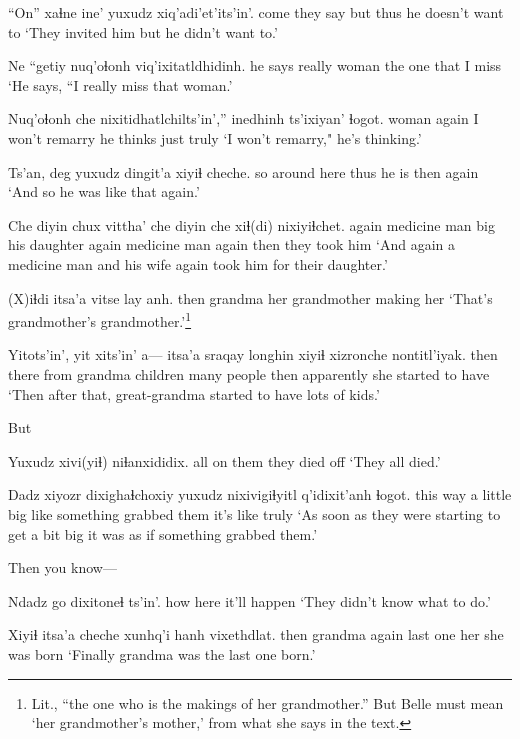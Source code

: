 \documentclass[12pt]{article}
\begin{document}
\gll ``On''   xaɬne    ine' yuxudz {xiq'adi'et'its'in'.}
come {they say} but thus   {he doesn't want to}
\glt `They invited him but he didn't want to.'
\glend

\gll Ne      ``getiy nuq'oɬonh viq'ixitatldhidinh.
{he says} really woman   {the one that I miss}
\glt `He says, ``I really miss that woman.'
\glend

\gll Nuq'oɬonh che  {nixitidhatlchilts'in'},'' inedhinh  ts'ixiyan' ɬogot.
woman again  {I won't remarry}    {he thinks} just       truly
\glt `I won't remarry," he's thinking.'
\glend

\gll Ts'an, deg yuxudz dingit'a xiyiɬ cheche. 
so    {around here} thus  {he is}  then   again   
\glt `And so he was like that again.'
\glend

\gll Che   diyin        chux vittha'      che   diyin        che   xiɬ(di) nixiyiɬchet.
again {medicine man} big {his daughter} again {medicine man} again then {they took him}
\glt `And again a medicine man and his wife again took him for their daughter.'
\glend

\gll (X)iɬdi itsa'a  vitse lay anh.
then  grandma {her grandmother} making her
\glt `That's grandmother's grandmother.'\footnote{Lit., ``the one who is the makings of her grandmother.'' But Belle must mean `her grandmother's mother,' from what she says in the text.}
\glend

\gll Yitots'in', yit    xits'in' a--- itsa'a  sraqay   longhin xiyiɬ xizronche nontitl'iyak.
then    there  from    {}  grandma children {many people}  then apparently   {she started to have}
\glt `Then after that, great-grandma started to have lots of kids.'
\glend

But 

\gll Yuxudz xivi(yiɬ) niɬanxididix.
all {on them}   {they died off}
\glt `They all died.'
\glend

\gll Dadz xiyozr dixighaɬchoxiy yuxudz nixivigiɬyitl q'idixit'anh ɬogot.
{this way} {a little} {big}           like   {something grabbed them} {it's like} truly
\glt `As soon as they were starting to get a bit big it was as if something grabbed them.'
\glend

Then you know---

\gll Ndadz go   dixitoneɬ ts'in'.
how   here {it'll happen}
\glt `They didn't know what to do.'
\glend

\gll Xiyiɬ itsa'a  cheche xunhq'i hanh vixethdlat.
then  grandma again  {last one} her {she was born}
\glt `Finally grandma was the last one born.'
\glend
\end{document}
